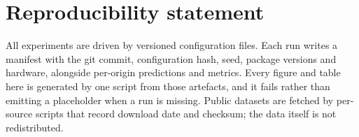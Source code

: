 \documentclass[11pt]{article}
\theoremstyle{plain}
\theoremstyle{definition}
\theoremstyle{remark}
\begin{document}
\section*{Reproducibility statement}

All experiments are driven by versioned configuration files. Each run writes a manifest with the git commit, configuration hash, seed, package versions and hardware, alongside per-origin predictions and metrics. Every figure and table here is generated by one script from those artefacts, and it fails rather than emitting a placeholder when a run is missing. Public datasets are fetched by per-source scripts that record download date and checksum; the data itself is not redistributed.



\end{document}

